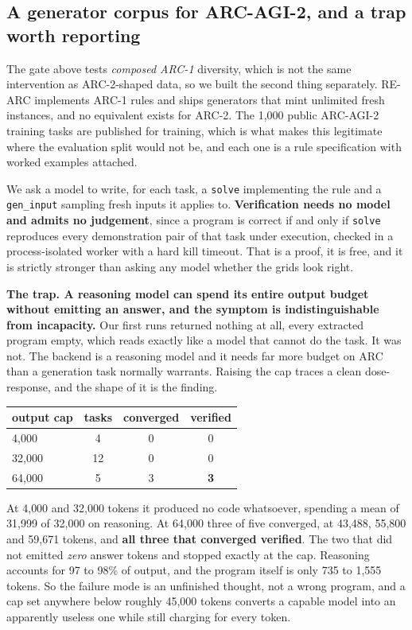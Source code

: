 \documentclass[11pt]{article}
\begin{document}
\subsection{A generator corpus for ARC-AGI-2, and a trap worth reporting}
\label{sec:gencorpus}
The gate above tests \emph{composed ARC-1} diversity, which is not the same intervention as
ARC-2-shaped data, so we built the second thing separately. RE-ARC implements ARC-1 rules and ships
generators that mint unlimited fresh instances, and no equivalent exists for ARC-2. The 1{,}000 public
ARC-AGI-2 training tasks are published for training, which is what makes this legitimate where the
evaluation split would not be, and each one is a rule specification with worked examples attached.

We ask a model to write, for each task, a \texttt{solve} implementing the rule and a \texttt{gen\_input}
sampling fresh inputs it applies to. \textbf{Verification needs no model and admits no judgement}, since a
program is correct if and only if \texttt{solve} reproduces every demonstration pair of that task under
execution, checked in a process-isolated worker with a hard kill timeout. That is a proof, it is free,
and it is strictly stronger than asking any model whether the grids look right.

\textbf{The trap. A reasoning model can spend its entire output budget without emitting an answer,
and the symptom is indistinguishable from incapacity.} Our first runs returned nothing at all, every
extracted program empty, which reads exactly like a model that cannot do the task. It was not. The
backend is a reasoning model and it needs far more budget on ARC than a generation task normally
warrants. Raising the cap traces a clean dose-response, and the shape of it is the finding.

\begin{center}
\begin{tabular}{lccc}
\toprule
output cap & tasks & converged & verified \\
\midrule
4{,}000 & 4 & 0 & 0 \\
32{,}000 & 12 & 0 & 0 \\
64{,}000 & 5 & 3 & \textbf{3} \\
\bottomrule
\end{tabular}
\end{center}

At 4{,}000 and 32{,}000 tokens it produced no code whatsoever, spending a mean of 31{,}999 of 32{,}000
on reasoning. At 64{,}000 three of five converged, at 43{,}488, 55{,}800 and 59{,}671 tokens, and
\textbf{all three that converged verified}. The two that did not emitted \emph{zero} answer tokens and
stopped exactly at the cap. Reasoning accounts for 97 to 98\% of output, and the program itself is only
735 to 1{,}555 tokens. So the failure mode is an unfinished thought, not a wrong program, and a
cap set anywhere below roughly 45{,}000 tokens converts a capable model into an apparently useless one
while still charging for every token.
\end{document}
